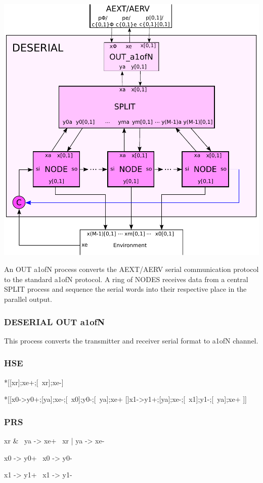 \documentclass{article}
\begin{document}
\begin{center}
  \includegraphics[width=.45\textwidth]{img/deserial.pdf}
\end{center}

An OUT a1ofN process converts the AEXT/AERV serial communication protocol to the
standard a1ofN protocol. A ring of NODES receives data from a central SPLIT
process and sequence the serial words into their respective place in the parallel
output.

\subsubsection{DESERIAL OUT a1ofN \label{sec:OUT_a1ofN}}

This process converts the transmitter and receiver serial format to a1ofN channel.

\subsubsection*{HSE}

\begin{hse}
*[[xr];xe+;[~xr];xe-]

*[[x0->y0+;[ya];xe-;[~x0];y0-;[~ya];xe+
  []x1->y1+;[ya];xe-;[~x1];y1-;[~ya];xe+
 ]]
\end{hse}

\subsubsection*{PRS}

\begin{prs2}
xr & ~ya -> xe+
~xr | ya -> xe-
\end{prs2}

\begin{prs2}
x0 -> y0+
~x0 -> y0-

x1 -> y1+
~x1 -> y1-
\end{prs2}
\end{document}

